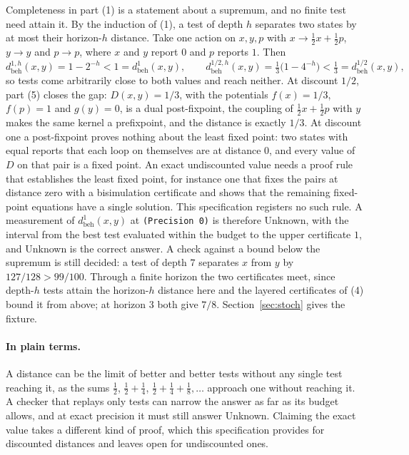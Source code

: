 \documentclass[11pt]{article}
\newcommand{\code}[1]{\texttt{#1}}
\newcommand{\dbeh}{d_{\mathrm{beh}}}
\newcommand{\plain}{\paragraph{In plain terms.}}
\theoremstyle{definition}
\theoremstyle{plain}
\begin{document}
Completeness in part (1) is a statement about a supremum, and no finite test need attain it. By the
induction of (1), a test of depth $h$ separates two states by at most their horizon-$h$ distance.
Take one action on $x,y,p$ with $x\to\tfrac12x+\tfrac12p$, $y\to y$ and $p\to p$, where $x$ and $y$
report $0$ and $p$ reports $1$. Then
\[
\dbeh^{1,h}(x,y)=1-2^{-h}<1=\dbeh^{1}(x,y),\qquad
\dbeh^{1/2,h}(x,y)=\tfrac13\bigl(1-4^{-h}\bigr)<\tfrac13=\dbeh^{1/2}(x,y),
\]
so tests come arbitrarily close to both values and reach neither. At discount $1/2$, part (5)
closes the gap: $D(x,y)=1/3$, with the potentials $f(x)=1/3$, $f(p)=1$ and $g(y)=0$, is a dual
post-fixpoint, the coupling of $\tfrac12x+\tfrac12p$ with $y$ makes the same kernel a prefixpoint,
and the distance is exactly $1/3$. At discount one a post-fixpoint proves nothing about the least
fixed point: two states with equal reports that each loop on themselves are at distance $0$, and
every value of $D$ on that pair is a fixed point. An exact undiscounted value needs a proof rule that
establishes the least fixed point, for instance one that fixes the pairs at distance zero with a
bisimulation certificate and shows that the remaining fixed-point equations have a single solution.
This specification registers no such rule. A measurement of $\dbeh^1(x,y)$ at \code{(Precision 0)}
is therefore Unknown, with the interval from the best test evaluated within the budget to the upper
certificate $1$, and Unknown is the correct answer. A check against a bound below the supremum is
still decided: a test of depth $7$ separates $x$ from $y$ by $127/128>99/100$. Through a finite
horizon the two certificates meet, since depth-$h$ tests attain the horizon-$h$ distance here and the
layered certificates of (4) bound it from above; at horizon $3$ both give $7/8$.
Section~\ref{sec:stoch} gives the fixture.

\plain A distance can be the limit of better and better tests without any single test reaching it,
as the sums $\tfrac12$, $\tfrac12+\tfrac14$, $\tfrac12+\tfrac14+\tfrac18,\dots$ approach one without
reaching it. A checker that replays only tests can narrow the answer as far as its budget allows,
and at exact precision it must still answer Unknown. Claiming the exact value takes a different kind
of proof, which this specification provides for discounted distances and leaves open for
undiscounted ones.
\end{document}
